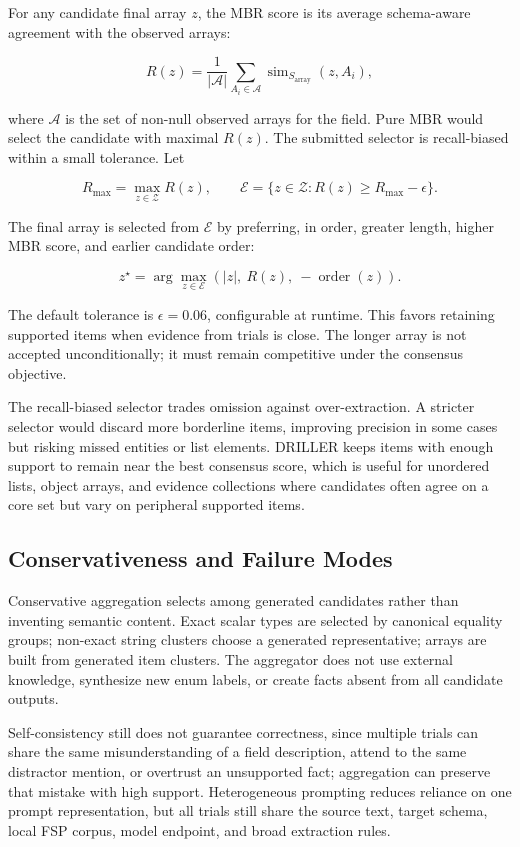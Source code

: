 For any candidate final array \(z\), the MBR score is its average schema-aware agreement with the observed arrays:

\[
R(z)=
\frac{1}{|\mathcal{A}|}
\sum_{A_i\in\mathcal{A}}
\operatorname{sim}_{S_{\mathrm{array}}}(z,A_i),
\]

where \(\mathcal{A}\) is the set of non-null observed arrays for the field. Pure MBR would select the candidate with maximal \(R(z)\). The submitted selector is recall-biased within a small tolerance. Let

\[
R_{\max}=\max_{z\in\mathcal{Z}} R(z),
\qquad
\mathcal{E}=\{z\in\mathcal{Z}: R(z)\geq R_{\max}-\epsilon\}.
\]

The final array is selected from \(\mathcal{E}\) by preferring, in order, greater length, higher MBR score, and earlier candidate order:

\[
z^\star=
\arg\max_{z\in\mathcal{E}}
\left(|z|,\ R(z),\ -\operatorname{order}(z)\right).
\]

The default tolerance is \(\epsilon=0.06\), configurable at runtime. This favors retaining supported items when evidence from trials is close. The longer array is not accepted unconditionally; it must remain competitive under the consensus objective.

The recall-biased selector trades omission against over-extraction. A stricter selector would discard more borderline items, improving precision in some cases but risking missed entities or list elements. DRILLER keeps items with enough support to remain near the best consensus score, which is useful for unordered lists, object arrays, and evidence collections where candidates often agree on a core set but vary on peripheral supported items.

\subsection{Conservativeness and Failure Modes}

Conservative aggregation selects among generated candidates rather than inventing semantic content. Exact scalar types are selected by canonical equality groups; non-exact string clusters choose a generated representative; arrays are built from generated item clusters. The aggregator does not use external knowledge, synthesize new enum labels, or create facts absent from all candidate outputs.

Self-consistency still does not guarantee correctness, since multiple trials can share the same misunderstanding of a field description, attend to the same distractor mention, or overtrust an unsupported fact; aggregation can preserve that mistake with high support. Heterogeneous prompting reduces reliance on one prompt representation, but all trials still share the source text, target schema, local FSP corpus, model endpoint, and broad extraction rules.

